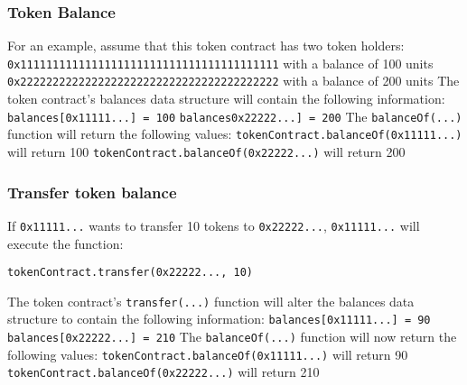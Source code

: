 \subsubsection{Token Balance}
For an example, assume that this token contract has two token holders: \newline
\hspace*{4ex} \texttt{0x1111111111111111111111111111111111111111} with a balance of 100 units
\newline
\hspace*{4ex} \texttt{0x2222222222222222222222222222222222222222} with a balance of 200 units
\newline
The token contract's balances data structure will contain the following information:
\newline
\hspace*{4ex} \texttt{balances[0x11111...] = 100}
\newline
\hspace*{4ex} \texttt{balances0x22222...] = 200}
\newline
The \texttt{balanceOf(...)} function will return the following values:
\newline
\hspace*{4ex} \texttt{tokenContract.balanceOf(0x11111...)} will return 100
\newline
\hspace*{4ex} \texttt{tokenContract.balanceOf(0x22222...)} will return 200

\subsubsection{Transfer token balance}
If \texttt{0x11111...} wants to transfer 10 tokens to \texttt{0x22222...}, \texttt{0x11111...} will execute the function:
\begin{lstlisting}[language=Solidity]
    tokenContract.transfer(0x22222..., 10)
\end{lstlisting}
The token contract's \texttt{transfer(...)} function will alter the balances data structure to contain the following information:
\newline
\hspace*{4ex} \texttt{balances[0x11111...] = 90}
\newline
\hspace*{4ex} \texttt{balances[0x22222...] = 210}
\newline
The \texttt{balanceOf(...)} function will now return the following values:
\newline
\hspace*{4ex} \texttt{tokenContract.balanceOf(0x11111...)} will return 90
\newline
\hspace*{4ex} \texttt{tokenContract.balanceOf(0x22222...)} will return 210

